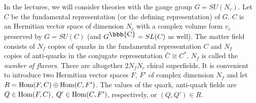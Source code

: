 \documentclass[lecture]{qft-l}
\newcommand{\co}{{\mbox{\bbb{C}}}}
\newcommand{\Hom}{{\rm Hom}}
\newcommand{\FT}{F'}%
\newcommand{\QT}{Q'}%
\numberwithin{figure}{chapter}
\begin{document}
In the lectures, we will consider theories with the gauge group $G=SU(N_c)$.
Let $C$ be the fundamental representation (or the defining representation) 
of $G$. 
$C$ is an Hermitian vector space of dimension $N_c$ with a complex volume form
$v_c$ preserved by $G=SU(C)$ (and $G^\co=SL(C)$ as well). 
The matter field consists of $N_f$ copies of quarks in the fundamental 
representation $C$ and $N_f$ copies of anti-quarks in the conjugate
representation $\bar{C}\cong C^*$.
$N_f$ is called the {\em number of flavors}.
There are altogether $2N_fN_c$ chiral superfields.
It is convenient to introduce two Hermitian vector spaces $F$, $\FT$
of complex dimension $N_f$ and let $R=\Hom(F,C)\oplus\Hom(C,\FT)$.
The values of the quark, anti-quark fields are $Q\in\Hom(F,C)$,
$\QT\in\Hom(C,\FT)$, respectively, or $(Q,\QT)\in R$.
\end{document}
